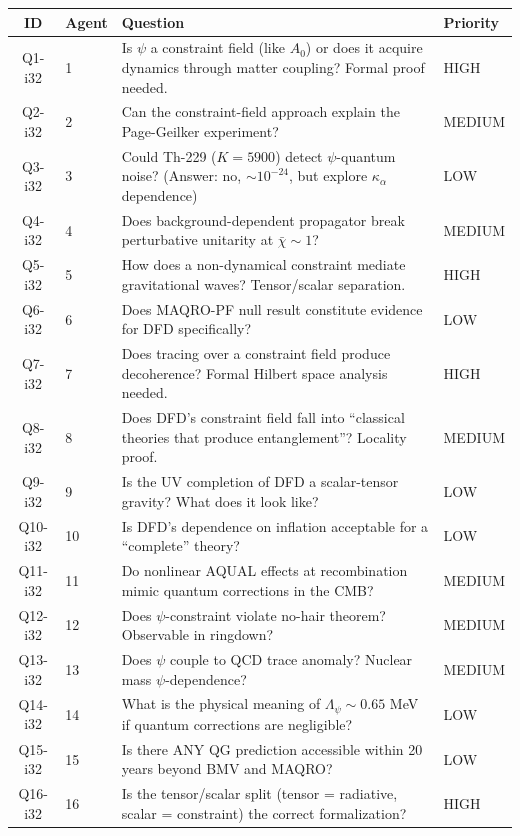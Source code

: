 \documentclass[11pt,a4paper]{article}
\begin{document}
\begin{center}
\begin{longtable}{clp{7cm}l}
\toprule
\textbf{ID} & \textbf{Agent} & \textbf{Question} & \textbf{Priority} \\
\midrule
\endfirsthead
Q1-i32 & 1 & Is $\psi$ a constraint field (like $A_0$) or does it acquire dynamics through matter coupling? Formal proof needed. & HIGH \\
Q2-i32 & 2 & Can the constraint-field approach explain the Page-Geilker experiment? & MEDIUM \\
Q3-i32 & 3 & Could Th-229 ($K=5900$) detect $\psi$-quantum noise? (Answer: no, $\sim 10^{-24}$, but explore $\kappa_\alpha$ dependence) & LOW \\
Q4-i32 & 4 & Does background-dependent propagator break perturbative unitarity at $\bar\chi \sim 1$? & MEDIUM \\
Q5-i32 & 5 & How does a non-dynamical constraint mediate gravitational waves? Tensor/scalar separation. & HIGH \\
Q6-i32 & 6 & Does MAQRO-PF null result constitute evidence for DFD specifically? & LOW \\
Q7-i32 & 7 & Does tracing over a constraint field produce decoherence? Formal Hilbert space analysis needed. & HIGH \\
Q8-i32 & 8 & Does DFD's constraint field fall into ``classical theories that produce entanglement''? Locality proof. & MEDIUM \\
Q9-i32 & 9 & Is the UV completion of DFD a scalar-tensor gravity? What does it look like? & LOW \\
Q10-i32 & 10 & Is DFD's dependence on inflation acceptable for a ``complete'' theory? & LOW \\
Q11-i32 & 11 & Do nonlinear AQUAL effects at recombination mimic quantum corrections in the CMB? & MEDIUM \\
Q12-i32 & 12 & Does $\psi$-constraint violate no-hair theorem? Observable in ringdown? & MEDIUM \\
Q13-i32 & 13 & Does $\psi$ couple to QCD trace anomaly? Nuclear mass $\psi$-dependence? & MEDIUM \\
Q14-i32 & 14 & What is the physical meaning of $\Lambda_\psi \sim 0.65$ MeV if quantum corrections are negligible? & LOW \\
Q15-i32 & 15 & Is there ANY QG prediction accessible within 20 years beyond BMV and MAQRO? & LOW \\
Q16-i32 & 16 & Is the tensor/scalar split (tensor = radiative, scalar = constraint) the correct formalization? & HIGH \\
\bottomrule
\end{longtable}
\end{center}
\end{document}
